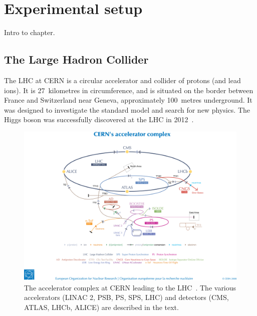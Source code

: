\chapter{Experimental setup}
\label{chap:detector}
Intro to chapter.

\section{The Large Hadron Collider}
The LHC at CERN is a circular accelerator and collider of protons (and lead 
ions). It is 27~kilometres in circumference, and is situated on the border 
between France and Switzerland near Geneva, approximately 100~metres 
underground. It was designed to investigate the standard model and search for 
new physics. The Higgs boson was successfully discovered at the LHC in 
2012~\cite{higgs-cms,higgs-atlas}.

\begin{figure}
\centering
\includegraphics[width=1\textwidth, trim={2cm 5cm 2cm 1.5cm}, 
clip]{figs/detector/lhc-complex}
\caption{The accelerator complex at CERN leading to the LHC~\cite{lhc-complex}. 
The various accelerators (LINAC 2, PSB, PS, SPS, LHC) and detectors (CMS, 
ATLAS, LHCb, ALICE) are described in the text.}
\label{fig:lhc-complex}
\end{figure}

